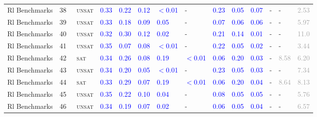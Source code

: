 \begin{center}
{\begin{longtable}{@{}llllllllllllll@{}}
Rl Benchmarks & 38 & ~\textsc{unsat} & \textcolor{blue}{0.33} & \textcolor{blue}{0.22} & \textcolor{blue}{0.12} & \textcolor{blue}{$<$0.01} & - & \textcolor{blue}{0.23} & \textcolor{blue}{0.05} & \textcolor{blue}{0.07} & - & - & \textcolor{darkgray}{2.53} \\
Rl Benchmarks & 39 & ~\textsc{unsat} & \textcolor{blue}{0.33} & \textcolor{blue}{0.18} & \textcolor{blue}{0.09} & \textcolor{blue}{0.05} & - & \textcolor{blue}{0.07} & \textcolor{blue}{0.06} & \textcolor{blue}{0.06} & - & - & \textcolor{darkgray}{5.97} \\
Rl Benchmarks & 40 & ~\textsc{unsat} & \textcolor{blue}{0.32} & \textcolor{blue}{0.30} & \textcolor{blue}{0.12} & \textcolor{blue}{0.02} & - & \textcolor{blue}{0.21} & \textcolor{blue}{0.14} & \textcolor{blue}{0.01} & - & - & \textcolor{darkgray}{11.0} \\
Rl Benchmarks & 41 & ~\textsc{unsat} & \textcolor{blue}{0.35} & \textcolor{blue}{0.07} & \textcolor{blue}{0.08} & \textcolor{blue}{$<$0.01} & - & \textcolor{blue}{0.22} & \textcolor{blue}{0.05} & \textcolor{blue}{0.02} & - & - & \textcolor{darkgray}{3.44} \\
Rl Benchmarks & 42 & ~\textsc{sat} & \textcolor{blue}{0.34} & \textcolor{blue}{0.26} & \textcolor{blue}{0.08} & \textcolor{blue}{0.19} & \textcolor{blue}{$<$0.01} & \textcolor{blue}{0.06} & \textcolor{blue}{0.20} & \textcolor{blue}{0.03} & - & \textcolor{darkgray}{8.58} & \textcolor{darkgray}{6.20} \\
Rl Benchmarks & 43 & ~\textsc{unsat} & \textcolor{blue}{0.34} & \textcolor{blue}{0.20} & \textcolor{blue}{0.05} & \textcolor{blue}{$<$0.01} & - & \textcolor{blue}{0.23} & \textcolor{blue}{0.05} & \textcolor{blue}{0.03} & - & - & \textcolor{darkgray}{7.34} \\
Rl Benchmarks & 44 & ~\textsc{sat} & \textcolor{blue}{0.33} & \textcolor{blue}{0.29} & \textcolor{blue}{0.07} & \textcolor{blue}{0.19} & \textcolor{blue}{$<$0.01} & \textcolor{blue}{0.06} & \textcolor{blue}{0.20} & \textcolor{blue}{0.04} & - & \textcolor{darkgray}{8.64} & \textcolor{darkgray}{8.13} \\
Rl Benchmarks & 45 & ~\textsc{unsat} & \textcolor{blue}{0.35} & \textcolor{blue}{0.22} & \textcolor{blue}{0.10} & \textcolor{blue}{0.04} & - & \textcolor{blue}{0.08} & \textcolor{blue}{0.05} & \textcolor{blue}{0.05} & - & - & \textcolor{darkgray}{5.76} \\
Rl Benchmarks & 46 & ~\textsc{unsat} & \textcolor{blue}{0.34} & \textcolor{blue}{0.19} & \textcolor{blue}{0.07} & \textcolor{blue}{0.02} & - & \textcolor{blue}{0.06} & \textcolor{blue}{0.05} & \textcolor{blue}{0.04} & - & - & \textcolor{darkgray}{6.57} \\

\end{longtable}}
\end{center}
